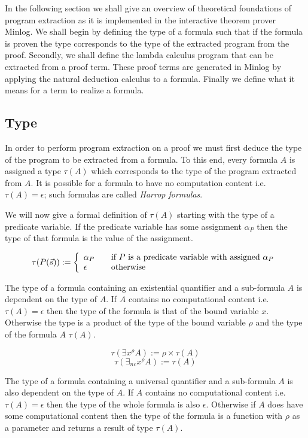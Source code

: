 In the following section we shall give an overview of theoretical foundations of program extraction as it is implemented in the interactive theorem prover Minlog. We shall begin by defining the type of a formula such that if the formula is proven the type corresponds to the type of the extracted program from the proof. Secondly, we shall define the lambda calculus program that can be extracted from a proof term. These proof terms are generated in Minlog by applying the natural deduction calculus to a formula.  Finally we define what it means for a term to realize a formula.

\subsection*{Type}
In order to perform program extraction on a proof we must first deduce the
type of the program to be extracted from a formula. To this end, every formula $A$ is assigned a type $\tau(A)$ which corresponds to the type of the program extracted from $A$. It is possible for a formula to have no computation content i.e. $\tau(A) = \epsilon$; such formulas are called \emph{Harrop formulas}.


We will now give a formal definition of $\tau (A)$ starting with the type of a
predicate variable. If the predicate variable has some assignment $\alpha_P$ then the type of that
formula is the value of the assignment.


\[
\tau(P(\vec{s})) := \left\{ 
\begin{array}{l l}
  \alpha_P & \quad \text{if $P$ is a predicate variable with assigned $\alpha_P$}\\
 \epsilon & \quad \text{otherwise}\\
\end{array} \right.
\]

The type of a formula containing an existential quantifier and a sub-formula
$A$ is dependent on the type of $A$. If $A$ contains no computational content
i.e. $\tau(A) = \epsilon$ then the type of the formula is that of the bound
variable $x$. Otherwise the type is a product of the type of the bound
variable $\rho$ and the type of the formula $A$ $\tau (A)$.

\[
\tau(\exists x^{\rho} A) :=  \rho \times \tau (A)
\]
\[
\tau(\exists_{nc} x^{\rho} A) := 
 \tau (A) 
\]

The type of a formula containing a universal quantifier and a sub-formula $A$
is also dependent on the type of $A$. If $A$ contains no computational content
i.e. $\tau (A) = \epsilon$ then the type of the whole formula is also
$\epsilon$. Otherwise if $A$ does have some computational content then the type
of the formula is a function with $\rho$ as a parameter and returns a result
of type $\tau (A)$.


